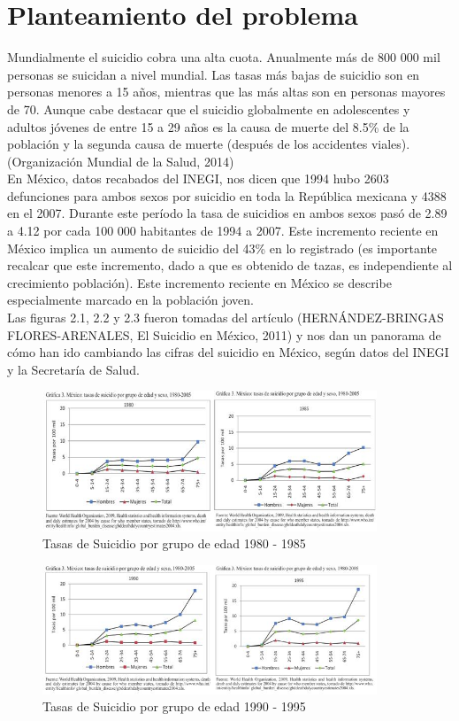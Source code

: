 \section{Planteamiento del problema}
{
Mundialmente el suicidio cobra una alta cuota.  Anualmente más de 800 000 mil personas se suicidan a nivel mundial. Las tasas más bajas de suicidio son en personas menores a 15 años, mientras que las más altas son en personas mayores de 70. Aunque cabe destacar que el suicidio globalmente en adolescentes y adultos jóvenes de entre 15 a 29 años es la causa de muerte del 8.5\% de la población y la segunda causa de muerte (después de los accidentes viales). (Organización Mundial de la Salud, 2014)\\

En México, datos recabados del INEGI, nos dicen que 1994 hubo 2603 defunciones para ambos sexos por suicidio en toda la República mexicana  y 4388 en el 2007. Durante este período la tasa de suicidios en ambos sexos pasó de 2.89  a 4.12 por cada 100 000 habitantes de 1994 a 2007. Este incremento reciente en México implica un aumento de suicidio del 43\% en lo registrado (es importante recalcar que este incremento, dado a que es obtenido de tazas, es independiente al crecimiento población). Este incremento reciente en México se describe especialmente marcado en la población joven.\\

Las figuras 2.1, 2.2 y 2.3 fueron tomadas del artículo (HERNÁNDEZ-BRINGAS FLORES-ARENALES, El Suicidio en México, 2011) y nos dan un panorama  de cómo han ido cambiando las cifras del suicidio en México, según datos del INEGI y la Secretaría de Salud.

\begin{figure}[hbtp]
\centering
\includegraphics[width=10cm]{imagenes/1-suicidio/Graficas80_85.jpg}
\caption{Tasas de Suicidio por grupo de edad 1980 - 1985}
\end{figure}

\begin{figure}[hbtp]
\centering
\includegraphics[width=10cm]{imagenes/1-suicidio/Graficas90_95.jpg}
\caption{Tasas de Suicidio por grupo de edad 1990 - 1995}
\end{figure}

}
